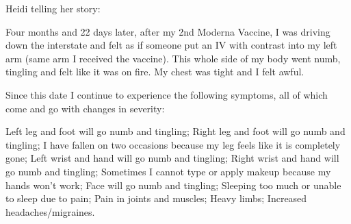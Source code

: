 Heidi telling her story:

Four months and 22 days later, after my 2nd Moderna Vaccine, I was driving down
the interstate and felt as if someone put an IV with contrast into my left arm
(same arm I received the vaccine). This whole side of my body went numb,
tingling and felt like it was on fire. My chest was tight and I felt awful.

Since this date I continue to experience the following symptoms, all of which
come and go with changes in severity:

Left leg and foot will go numb and tingling; Right leg and foot will go numb and
tingling; I have fallen on two occasions because my leg feels like it is
completely gone; Left wrist and hand will go numb and tingling; Right wrist and
hand will go numb and tingling; Sometimes I cannot type or apply makeup because
my hands won’t work; Face will go numb and tingling; Sleeping too much or unable
to sleep due to pain; Pain in joints and muscles; Heavy limbs; Increased
headaches/migraines.

